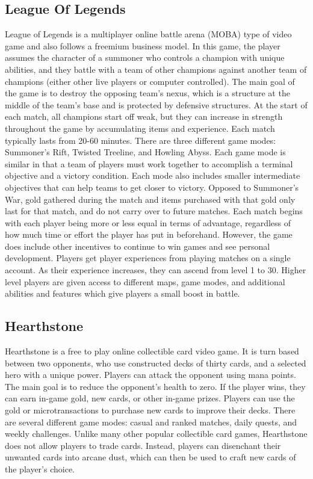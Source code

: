 \subsection{League Of Legends}
League of Legends is a multiplayer online battle arena (MOBA) type of video game and also follows a freemium business model. In this game, the player assumes the character of a summoner who controls a champion with unique abilities, and they battle with a team of other champions against another team of champions (either other live players or computer controlled). The main goal of the game is to destroy the opposing team's nexus, which is a structure at the middle of the team's base and is protected by defensive structures. At the start of each match, all champions start off weak, but they can increase in strength throughout the game by accumulating items and experience. Each match typically lasts from 20-60 minutes. There are three different game modes: Summoner's Rift, Twisted Treeline, and Howling Abyss. Each game mode is similar in that a team of players must work together to accomplish a terminal objective and a victory condition. Each mode also includes smaller intermediate objectives that can help teams to get closer to victory. 
	Opposed to Summoner's War, gold gathered during the match and items purchased with that gold only last for that match, and do not carry over to future matches. Each match begins with each player being more or less equal in terms of advantage, regardless of how much time or effort the player has put in beforehand. 
	However, the game does include other incentives to continue to win games and see personal development. Players get player experiences from playing matches on a single account. As their experience increases, they can ascend from level 1 to 30. Higher level players are given access to different maps, game modes, and additional abilities and features which give players a small boost in battle. 
\subsection{Hearthstone}
Hearthstone is a free to play online collectible card video game. It is turn based between two opponents, who use constructed decks of thirty cards, and a selected hero with a unique power. Players can attack the opponent using mana points. The main goal is to reduce the opponent's health to zero. If the player wins, they can earn in-game gold, new cards, or other in-game prizes. Players can use the gold or microtransactions to purchase new cards to improve their decks. There are several different game modes: casual and ranked matches, daily quests, and weekly challenges. Unlike many other popular collectible card games, Hearthstone does not allow players to trade cards. Instead, players can disenchant their unwanted cards into arcane dust, which can then be used to craft new cards of the player's choice. 
